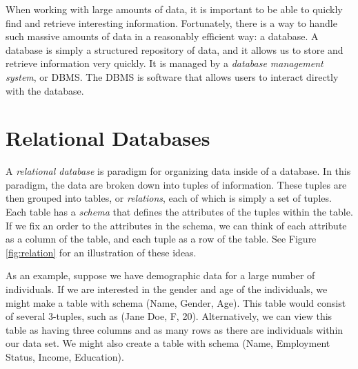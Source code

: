 \newcommand{\lsql}[1]{\lstinline[language=SQL,prebreak=]!#1!}

\label{lab:sql_rdb}

When working with large amounts of data, it is important to be able to quickly find and retrieve interesting information.
Fortunately, there is a way to handle such massive amounts of data in a reasonably efficient way: a database.
A database is simply a structured repository of data, and it allows us to store and retrieve information very quickly.
It is managed by a \emph{database management system}, or DBMS.
The DBMS is software that allows users to interact directly with the database.

\section*{Relational Databases}
A \emph{relational database} is paradigm for organizing data inside of a database.
In this paradigm, the data are broken down into tuples of information.
These tuples are then grouped into tables, or \emph{relations}, each of which is simply a set of tuples.
Each table has a \emph{schema} that defines the attributes of the tuples within the table.
If we fix an order to the attributes in the schema, we can think of each attribute as a column
of the table, and each tuple as a row of the table. See Figure \ref{fig:relation} for an illustration of
these ideas.

As an example, suppose we have demographic data for a large number of individuals.
If we are interested in the gender and age of the individuals, we might make a table
with schema (Name, Gender, Age). This table would consist of several 3-tuples, such as
(Jane Doe, F, 20). Alternatively, we can view this table as having three columns
and as many rows as there are individuals within our data set.
We might also create a table with schema (Name, Employment Status, Income, Education).

